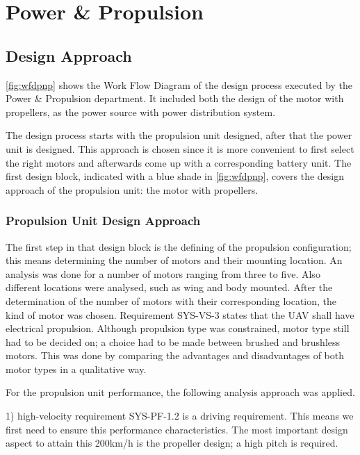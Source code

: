 \chapter{Power \& Propulsion}
\setlength{\parindent}{15pt}
\label{ch:powe_prop}

\section{Design Approach}
\label{sec:DAPNP}

\autoref{fig:wfdpnp} shows the Work Flow Diagram of the design process executed by the Power \& Propulsion department. It included both the design of the motor with propellers, as the power source with power distribution system. 

The design process starts with the propulsion unit designed, after that the power unit is designed. This approach is chosen since it is more convenient to first select the right motors and afterwards come up with a corresponding battery unit. The first design block, indicated with a blue shade in \autoref{fig:wfdpnp}, covers the design approach of the propulsion unit: the motor with propellers. 

\subsection*{Propulsion Unit Design Approach}
The first step in that design block is the defining of the propulsion configuration; this means determining the number of motors and their mounting location. An analysis was done for a number of motors ranging from three to five. Also different locations were analysed, such as wing and body mounted. After the determination of the number of motors with their corresponding location, the kind of motor was chosen. Requirement SYS-VS-3 states that the UAV shall have electrical propulsion. Although propulsion type was constrained, motor type still had to be decided on; a choice had to be made between brushed and brushless motors. This was done by comparing the advantages and disadvantages of both motor types in a qualitative way.

For the propulsion unit performance, the following analysis approach was applied.

1) high-velocity requirement SYS-PF-1.2 is a driving requirement. This means we first need to ensure this performance characteristics. The most important design aspect to attain this 200km/h is the propeller design; a high pitch is required. 

